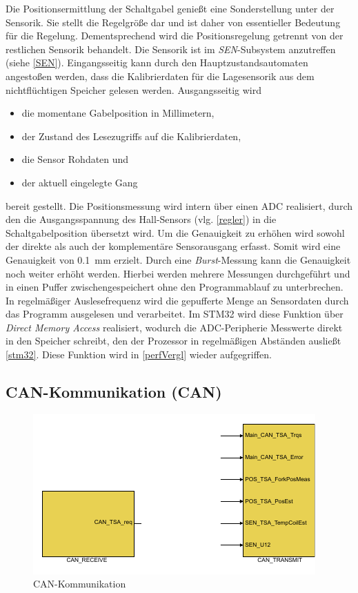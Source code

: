 Die Positionsermittlung der Schaltgabel genießt eine Sonderstellung unter der Sensorik. Sie stellt die Regelgröße dar und ist daher von essentieller Bedeutung für die Regelung.  Dementsprechend wird die Positionsregelung getrennt von der restlichen Sensorik behandelt. Die Sensorik ist im \textit{SEN}-Subsystem anzutreffen (siehe \autoref{SEN}). Eingangsseitig kann durch den Hauptzustandsautomaten angestoßen werden, dass die Kalibrierdaten für die Lagesensorik aus dem nichtflüchtigen Speicher gelesen werden. Ausgangsseitig wird 
\begin{itemize}
	\item die momentane Gabelposition in Millimetern,
	\item der Zustand des Lesezugriffs auf die Kalibrierdaten,
	\item die Sensor Rohdaten und 
	\item der aktuell eingelegte Gang
\end{itemize}
bereit gestellt. 
Die Positionsmessung wird intern über einen ADC realisiert, durch den die Ausgangsspannung des Hall-Sensors (vlg. \autoref{regler}) in die Schaltgabelposition übersetzt wird. Um die Genauigkeit zu erhöhen wird sowohl der direkte als auch der komplementäre Sensorausgang erfasst. Somit wird eine Genauigkeit von \SI{0,1}{mm} erzielt. Durch eine \textit{Burst}-Messung kann die Genauigkeit noch weiter erhöht werden. Hierbei werden mehrere Messungen durchgeführt und in einen Puffer zwischengespeichert ohne den Programmablauf zu unterbrechen. In regelmäßiger Auslesefrequenz wird die gepufferte Menge an Sensordaten durch das Programm ausgelesen und verarbeitet. Im STM32 wird diese Funktion über \textit{Direct Memory Access} realisiert, wodurch die ADC-Peripherie Messwerte direkt in den Speicher schreibt, den der Prozessor in regelmäßigen Abständen ausließt \autoref{stm32}. Diese Funktion wird in \autoref{perfVergl} wieder aufgegriffen.

\subsection{CAN-Kommunikation (CAN)}

\begin{figure}[H]%
\centering
\includegraphics[width=0.6\columnwidth]{./Bilder/fig_can}%
\caption{CAN-Kommunikation}%
\label{fig_can}%
\end{figure}

